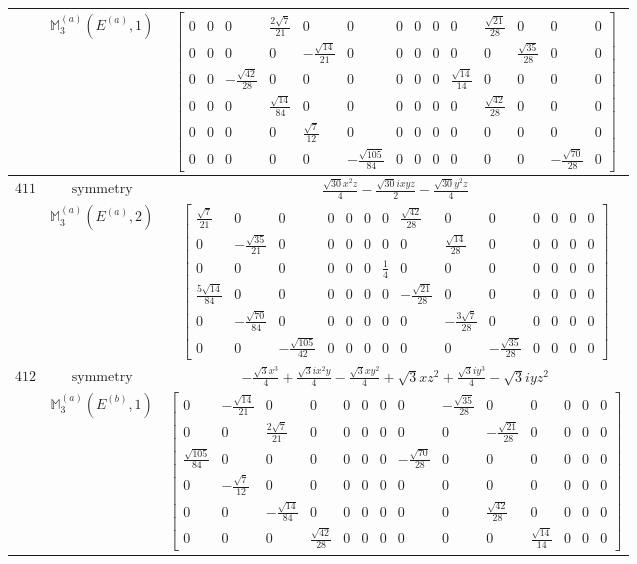 \documentclass[fleqn,8pt,landscape]{jsarticle}
\begin{document}
\begin{longtable}{ccc}
$  $ & $ \mathbb{M}_{3}^{(a)}(E^{(a)},1) $ & $ \begin{bmatrix} 0 & 0 & 0 & \frac{2 \sqrt{7}}{21} & 0 & 0 & 0 & 0 & 0 & 0 & \frac{\sqrt{21}}{28} & 0 & 0 & 0 \\ 0 & 0 & 0 & 0 & - \frac{\sqrt{14}}{21} & 0 & 0 & 0 & 0 & 0 & 0 & \frac{\sqrt{35}}{28} & 0 & 0 \\ 0 & 0 & - \frac{\sqrt{42}}{28} & 0 & 0 & 0 & 0 & 0 & 0 & \frac{\sqrt{14}}{14} & 0 & 0 & 0 & 0 \\ 0 & 0 & 0 & \frac{\sqrt{14}}{84} & 0 & 0 & 0 & 0 & 0 & 0 & \frac{\sqrt{42}}{28} & 0 & 0 & 0 \\ 0 & 0 & 0 & 0 & \frac{\sqrt{7}}{12} & 0 & 0 & 0 & 0 & 0 & 0 & 0 & 0 & 0 \\ 0 & 0 & 0 & 0 & 0 & - \frac{\sqrt{105}}{84} & 0 & 0 & 0 & 0 & 0 & 0 & - \frac{\sqrt{70}}{28} & 0 \end{bmatrix} $ \\ \hline
$ 411 $ & $ \text{symmetry} $ & $ \frac{\sqrt{30} x^{2} z}{4} - \frac{\sqrt{30} i x y z}{2} - \frac{\sqrt{30} y^{2} z}{4} $ \\
$  $ & $ \mathbb{M}_{3}^{(a)}(E^{(a)},2) $ & $ \begin{bmatrix} \frac{\sqrt{7}}{21} & 0 & 0 & 0 & 0 & 0 & 0 & \frac{\sqrt{42}}{28} & 0 & 0 & 0 & 0 & 0 & 0 \\ 0 & - \frac{\sqrt{35}}{21} & 0 & 0 & 0 & 0 & 0 & 0 & \frac{\sqrt{14}}{28} & 0 & 0 & 0 & 0 & 0 \\ 0 & 0 & 0 & 0 & 0 & 0 & \frac{1}{4} & 0 & 0 & 0 & 0 & 0 & 0 & 0 \\ \frac{5 \sqrt{14}}{84} & 0 & 0 & 0 & 0 & 0 & 0 & - \frac{\sqrt{21}}{28} & 0 & 0 & 0 & 0 & 0 & 0 \\ 0 & - \frac{\sqrt{70}}{84} & 0 & 0 & 0 & 0 & 0 & 0 & - \frac{3 \sqrt{7}}{28} & 0 & 0 & 0 & 0 & 0 \\ 0 & 0 & - \frac{\sqrt{105}}{42} & 0 & 0 & 0 & 0 & 0 & 0 & - \frac{\sqrt{35}}{28} & 0 & 0 & 0 & 0 \end{bmatrix} $ \\ \hline
$ 412 $ & $ \text{symmetry} $ & $ - \frac{\sqrt{3} x^{3}}{4} + \frac{\sqrt{3} i x^{2} y}{4} - \frac{\sqrt{3} x y^{2}}{4} + \sqrt{3} x z^{2} + \frac{\sqrt{3} i y^{3}}{4} - \sqrt{3} i y z^{2} $ \\
$  $ & $ \mathbb{M}_{3}^{(a)}(E^{(b)},1) $ & $ \begin{bmatrix} 0 & - \frac{\sqrt{14}}{21} & 0 & 0 & 0 & 0 & 0 & 0 & - \frac{\sqrt{35}}{28} & 0 & 0 & 0 & 0 & 0 \\ 0 & 0 & \frac{2 \sqrt{7}}{21} & 0 & 0 & 0 & 0 & 0 & 0 & - \frac{\sqrt{21}}{28} & 0 & 0 & 0 & 0 \\ \frac{\sqrt{105}}{84} & 0 & 0 & 0 & 0 & 0 & 0 & - \frac{\sqrt{70}}{28} & 0 & 0 & 0 & 0 & 0 & 0 \\ 0 & - \frac{\sqrt{7}}{12} & 0 & 0 & 0 & 0 & 0 & 0 & 0 & 0 & 0 & 0 & 0 & 0 \\ 0 & 0 & - \frac{\sqrt{14}}{84} & 0 & 0 & 0 & 0 & 0 & 0 & \frac{\sqrt{42}}{28} & 0 & 0 & 0 & 0 \\ 0 & 0 & 0 & \frac{\sqrt{42}}{28} & 0 & 0 & 0 & 0 & 0 & 0 & \frac{\sqrt{14}}{14} & 0 & 0 & 0 \end{bmatrix} $ \\ \hline

\end{longtable}
\end{document}
